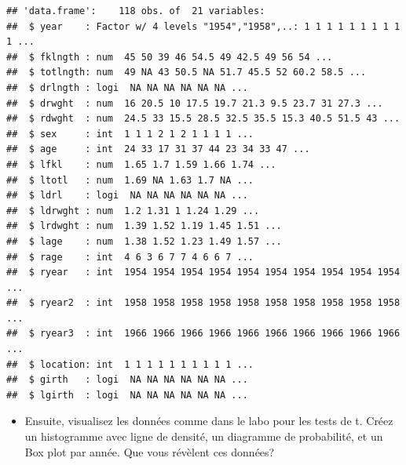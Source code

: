 \documentclass[12pt,]{book}
\newenvironment{Shaded}{\begin{snugshade}}{\end{snugshade}}
\newcommand{\CommentTok}[1]{\textcolor[rgb]{0.37,0.37,0.37}{\textit{#1}}}
\newcommand{\DataTypeTok}[1]{\textcolor[rgb]{0.27,0.27,0.27}{#1}}
\newcommand{\DecValTok}[1]{\textcolor[rgb]{0.06,0.06,0.06}{#1}}
\newcommand{\FloatTok}[1]{\textcolor[rgb]{0.06,0.06,0.06}{#1}}
\newcommand{\KeywordTok}[1]{\textcolor[rgb]{0.27,0.27,0.27}{\textbf{#1}}}
\newcommand{\NormalTok}[1]{#1}
\newcommand{\OperatorTok}[1]{\textcolor[rgb]{0.43,0.43,0.43}{\textbf{#1}}}
\newcommand{\StringTok}[1]{\textcolor[rgb]{0.5,0.5,0.5}{#1}}
\providecommand{\tightlist}{%
  \setlength{\itemsep}{0pt}\setlength{\parskip}{0pt}}
\begin{document}
\begin{verbatim}
## 'data.frame':	118 obs. of  21 variables:
##  $ year    : Factor w/ 4 levels "1954","1958",..: 1 1 1 1 1 1 1 1 1 1 ...
##  $ fklngth : num  45 50 39 46 54.5 49 42.5 49 56 54 ...
##  $ totlngth: num  49 NA 43 50.5 NA 51.7 45.5 52 60.2 58.5 ...
##  $ drlngth : logi  NA NA NA NA NA NA ...
##  $ drwght  : num  16 20.5 10 17.5 19.7 21.3 9.5 23.7 31 27.3 ...
##  $ rdwght  : num  24.5 33 15.5 28.5 32.5 35.5 15.3 40.5 51.5 43 ...
##  $ sex     : int  1 1 1 2 1 2 1 1 1 1 ...
##  $ age     : int  24 33 17 31 37 44 23 34 33 47 ...
##  $ lfkl    : num  1.65 1.7 1.59 1.66 1.74 ...
##  $ ltotl   : num  1.69 NA 1.63 1.7 NA ...
##  $ ldrl    : logi  NA NA NA NA NA NA ...
##  $ ldrwght : num  1.2 1.31 1 1.24 1.29 ...
##  $ lrdwght : num  1.39 1.52 1.19 1.45 1.51 ...
##  $ lage    : num  1.38 1.52 1.23 1.49 1.57 ...
##  $ rage    : int  4 6 3 6 7 7 4 6 6 7 ...
##  $ ryear   : int  1954 1954 1954 1954 1954 1954 1954 1954 1954 1954 ...
##  $ ryear2  : int  1958 1958 1958 1958 1958 1958 1958 1958 1958 1958 ...
##  $ ryear3  : int  1966 1966 1966 1966 1966 1966 1966 1966 1966 1966 ...
##  $ location: int  1 1 1 1 1 1 1 1 1 1 ...
##  $ girth   : logi  NA NA NA NA NA NA ...
##  $ lgirth  : logi  NA NA NA NA NA NA ...
\end{verbatim}

\begin{itemize}
\tightlist
\item
  Ensuite, visualisez les données comme dans le labo pour les tests de t. Créez un histogramme avec ligne de densité, un diagramme de probabilité, et un Box plot par année. Que vous révèlent ces données?
\end{itemize}

\begin{Shaded}
\end{Shaded}
\end{document}
